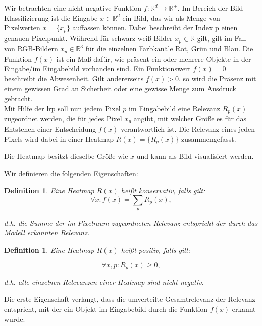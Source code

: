 \documentclass[11pt,a4paper]{article}
\def\emph#1{\textit{#1}}
\newtheorem{definition}[theorem]{Definition}
\numberwithin{equation}{section}
\begin{document}
	Wir betrachten eine nicht-negative Funktion $f: \mathbb{R}^d \to \mathbb{R}^{+}$. Im Bereich der Bild-Klassifizierung ist die Eingabe $x \in \mathbb{R}^d$ ein Bild, das wir als Menge von Pixelwerten $x=\lbrace x_p \rbrace$ auffassen können. Dabei beschreibt der Index p einen genauen Pixelpunkt. Während für schwarz-weiß Bilder $x_p \in \mathbb{R}$ gilt, gilt im Fall von RGB-Bildern $x_p \in \mathbb{R}^3$ für die einzelnen Farbkanäle Rot, Grün und Blau. Die Funktion $f(x)$ ist ein Maß dafür, wie präsent ein oder mehrere Objekte in der Eingabe/im Eingabebild vorhanden sind. Ein Funktionswert $f(x)=0$ beschreibt die Abwesenheit. Gilt andererseits $f(x) >0$, so wird die Präsenz mit einem gewissen Grad an Sicherheit oder eine gewisse Menge zum Ausdruck gebracht.\\
	
	Mit Hilfe der \gls{lrp} soll nun jedem Pixel $p$ im Eingabebild eine Relevanz $R_p(x)$ zugeordnet werden, die für jedes Pixel $x_p$ angibt, mit welcher Größe es für das Entstehen einer Entscheidung $f(x)$ verantwortlich ist. Die Relevanz eines jeden Pixels wird dabei in einer Heatmap $R(x) = \lbrace R_p(x) \rbrace$ zusammengefasst.
	
	Die Heatmap besitzt dieselbe Größe wie $x$ und kann als Bild visualisiert werden.
	
	Wir definieren die folgenden Eigenschaften:
	
	\begin{definition}\label{def_konservativ}
		Eine Heatmap $R(x)$ heißt \emph{konservativ}, falls gilt:
		\begin{equation}
		\forall x: f(x) = \sum_p R_p(x),
		\end{equation}
		
		d.h. die Summe der im Pixelraum zugeordneten Relevanz entspricht der durch das Modell erkannten Relevanz.
	\end{definition}
	
	
	\begin{definition} \label{def_pos}
		Eine Heatmap $R(x)$ heißt \emph{positiv}, falls gilt:
		
		\begin{equation}
		\forall x,p: R_p(x) \geq 0,
		\end{equation}
		
		d.h. alle einzelnen Relevanzen einer Heatmap sind nicht-negativ.
		
	\end{definition}
	
	Die erste Eigenschaft verlangt, dass die umverteilte Gesamtrelevanz der Relevanz entspricht, mit der ein Objekt im Eingabebild durch die Funktion $f(x)$ erkannt wurde.
	
\end{document}
